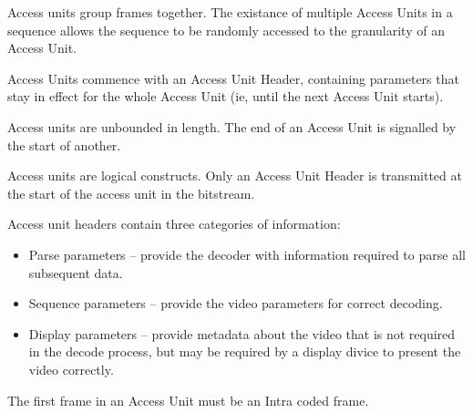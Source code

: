 Access units group frames together. The existance of multiple Access
Units in a sequence allows the sequence to be randomly accessed to the
granularity of an Access Unit.

Access Units commence with an Access Unit Header, containing parameters
that stay in effect for the whole Access Unit (ie, until the next Access
Unit starts).

Access units are unbounded in length.  The end of an Access Unit is
signalled by the start of another.

Access units are logical constructs.  Only an Access Unit Header is
transmitted at the start of the access unit in the bitstream.

Access unit headers contain three categories of information:

\begin{itemize}
    \item Parse parameters -- provide the decoder with information
        required to parse all subsequent data.

    \item Sequence parameters -- provide the video parameters for
        correct decoding.

    \item Display parameters -- provide metadata about the video that is
        not required in the decode process, but may be required by a
        display divice to present the video correctly.
\end{itemize}

The first frame in an Access Unit must be an Intra coded frame.
